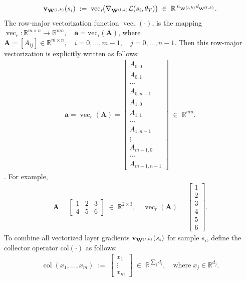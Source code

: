 \begin{align*}
    \mathbf{v}_{\mathbf{W}^{(l,k)}}(s_i)
    \;:=\;
    \operatorname{vec}_r\!\bigl(\nabla_{\mathbf{W}^{(l,k)}}\mathcal L(s_i,\theta_T)\bigr)
    \;\in\;\mathbb R^{\,n_{\mathbf{W}^{(l,k)}}d_{\mathbf{W}^{(l,k)}}}.
\end{align*}
The row-major vectorization function $\operatorname{vec}_r(\cdot)$, is the mapping $\operatorname{vec}_r:\mathbb{R}^{m \times n} \to \mathbb{R}^{mn}, \quad \mathbf{a} = \operatorname{vec_r}(\mathbf{A})$, where $\mathbf{A} = [A_{ij}] \in \mathbb{R}^{m \times n}, \quad i = 0, \ldots, m-1, \quad j = 0, \ldots, n-1$. Then this row-major vectorization is explicitly written as follows:
\begin{align*}
    \mathbf{a} = \operatorname{vec}_r(\mathbf A)=
    \begin{bmatrix}
    A_{0,0}\\ A_{0,1}\\ \cdots\\ A_{0,n-1}\\
    A_{1,0}\\ A_{1,1}\\ \cdots\\ A_{1,n-1}\\
    \vdots\\
    A_{m-1,0}\\ \cdots\\ A_{m-1,n-1}
    \end{bmatrix}
    \;\in\;\mathbb{R}^{mn}.
\end{align*}
\cite{curtarelli2023generalizedvectorizationinverse}. For example,
\begin{align*}
    \mathbf A=
    \begin{bmatrix}
    1 & 2 & 3\\
    4 & 5 & 6
    \end{bmatrix} \;\in\; \mathbb{R}^{2\times3}, 
    \quad 
    \operatorname{vec}_r(\mathbf A)=
    \begin{bmatrix}
    1\\2\\3\\4\\5\\6
    \end{bmatrix}.
\end{align*}
To combine all vectorized layer gradients $\mathbf{v}_{\mathbf{W}^{(l,k)}}(s_i)$ for sample $s_i$, define the collector operator $\operatorname{col(\cdot)}$ as follows:
\begin{align*}
    \operatorname{col}(x_1,\dots,x_m) \;:=\;
    \begin{bmatrix}
    x_1 \\ \vdots \\ x_m
    \end{bmatrix} \; \in \; \mathbb{R}^{\sum_{j}{d_j}}, \quad \text{where} \; x_j \in \mathbb{R}^{d_j}.
\end{align*}
